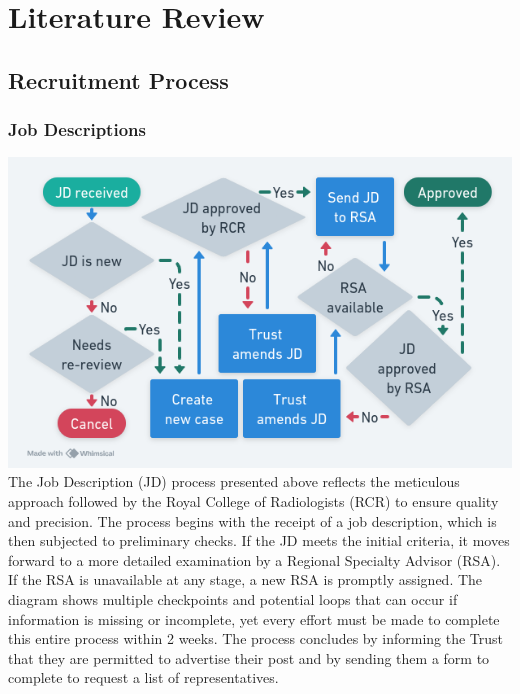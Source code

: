 \section{Literature Review}
\subsection{Recruitment Process}
\subsubsection{Job Descriptions}
\begin{multicols}{2}
    \noindent
\includegraphics[width=\linewidth]{images/jd.png}
The Job Description (JD) process presented above reflects the meticulous approach followed by the Royal College of Radiologists (RCR) to ensure quality and precision. The process begins with the receipt of a job description, which is then subjected to preliminary checks. If the JD meets the initial criteria, it moves forward to a more detailed examination by a Regional Specialty Advisor (RSA). If the RSA is unavailable at any stage, a new RSA is promptly assigned. The diagram shows multiple checkpoints and potential loops that can occur if information is missing or incomplete, yet every effort must be made to complete this entire process within 2 weeks. The process concludes by informing the Trust that they are permitted to advertise their post and by sending them a form to complete to request a list of representatives.

\end{multicols}
